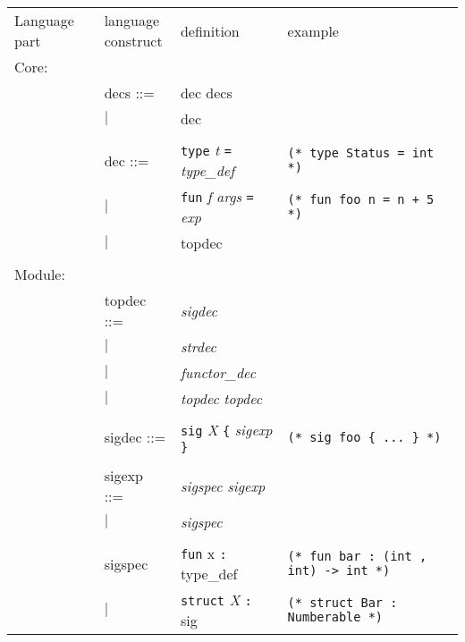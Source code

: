 \begin{tabular}{p{4em} p{7em} p{15em} p{16em}}
  \parbox[t]{4em}{Language part} & \parbox[t]{4em}{language \\construct} & definition & example \\
  Core:         &&& \\
                & decs ::= & dec decs & \\
                & $|$ & dec & \\
                \\
               
                & dec ::= 
                  & \texttt{type} \textit{t} \texttt{=} \textit{type\_def}
                    & \texttt{(* type Status = int *)}  \\
                & $|$
                  & \texttt{fun} \textit{f} \textit{args} \texttt{=} \textit{exp}
                    & \texttt{(* fun foo n = n + 5 *)} \\
                & $|$
                  & topdec & \\
                \\
Module:         &&& \\
                & topdec ::=
                  & \textit{sigdec} & \\
                & $|$
                  & \textit{strdec} & \\
                & $|$
                  & \textit{functor\_dec} & \\
                &$|$
                  & \textit{topdec} \textit{topdec} & \\
                \\
                & sigdec ::=
                  & \texttt{sig} \textit{X} \texttt{\{} \textit{sigexp} \texttt{\}}
                    & \texttt{(* sig foo \{ ... \} *)} \\\\
                & sigexp ::=
                  & \textit{sigspec sigexp} & \\
                & $|$
                  & \textit{sigspec}
                    & \\
                \\
                & sigspec
                  & \texttt{fun} x \texttt{:} type\_def
                    & \texttt{(* fun bar : (int , int) -> int *)}  \\
                & $|$
                  & \texttt{struct} \textit{X} \texttt{:} sig
                    & \texttt{(* struct Bar : Numberable *)} \\

\end{tabular}
